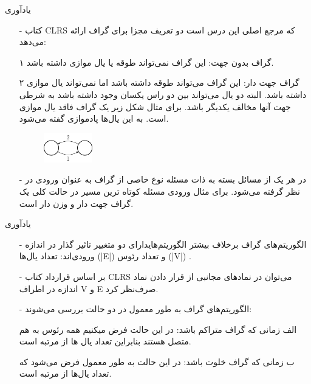 \begin{frame}{يادآوری}
	\begin{itemize}\itemr
		\item[-]
کتاب CLRS که مرجع اصلی این درس است دو تعریف مجزا برای گراف ارائه می‌دهد:
\item[۱]
گراف بدون جهت: این گراف نمی‌تواند طوقه یا یال موازی داشته باشد.
\item[۲]
گراف جهت دار: این گراف می‌تواند طوقه داشته باشد اما نمی‌تواند یال موازی داشته باشد. البته دو یال می‌تواند بین دو راس یکسان وجود داشته باشد به شرطی جهت آنها مخالف یکدیگر باشد. برای مثال شکل زیر یک گراف فاقد یال موازی است. به این یال‌ها پادموازی
 گفته می‌شود.

\begin{figure}[h!]
\centering
\includegraphics[width=0.2\textwidth]{figs/chap01/1.png}
\end{figure}
\item[-]
در هر یک از مسائل بسته به ذات مسئله نوع خاصی از گراف به عنوان ورودی در نظر گرفته می‌شود. برای مثال ورودی مسئله کوتاه ترین مسیر در حالت کلی یک گراف جهت دار و وزن دار است.
\end{itemize}
\end{frame}


\begin{frame}{يادآوری}
	\begin{itemize}\itemr
\item[-]
الگوریتم‌های گراف برخلاف بیشتر الگوریتم‌هایدارای دو متغییر تاثیر گذار در اندازه ورودی‌اند: تعداد یال‌ها (|E|) و تعداد رئوس (|V|) .
\item[-]
بر اساس قرارداد کتاب CLRS می‌توان در نمادهای مجانبی از قرار دادن نماد اندازه در اطراف V و E صرف‌نظر ‌کرد.

\item[-]
الگوریتم‌های گراف به طور معمول در دو حالت بررسی می‌شوند:
\item[الف]
زمانی که گراف متراکم باشد: در این حالت فرض میکنیم همه رئوس به هم متصل هستند بنابراین تعداد یال ها از مرتبه
است.
\item[ب]
زمانی که گراف خلوت باشد:‌ در این حالت به طور معمول فرض می‌شود که تعداد یال‌ها از مرتبه
است.

	\end{itemize}
\end{frame}

